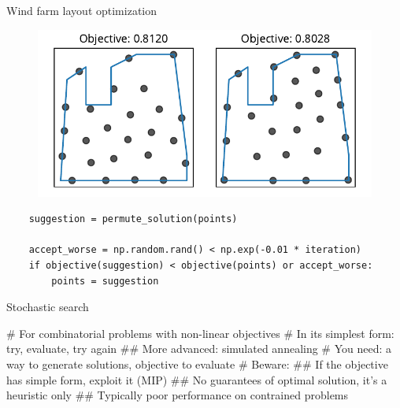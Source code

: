 \documentclass[12pt, aspectratio=149]{beamer}
\theoremstyle{plain}
\begin{document}
\begin{frame}[fragile]{Wind farm layout optimization}
\vspace*{-1em}
\begin{center}
 \begin{figure}
    	\centering
    	\includegraphics[width=0.99\linewidth]{figures/windfarm_sa}
 \end{figure}
 \end{center}
\vspace*{-2em}
\begin{center}
\begin{verbatim}
    suggestion = permute_solution(points)

    accept_worse = np.random.rand() < np.exp(-0.01 * iteration)
    if objective(suggestion) < objective(points) or accept_worse:
        points = suggestion
\end{verbatim}
\end{center}
\end{frame}


\begin{frame}[fragile]{Stochastic search}
	\begin{easylist}[itemize]
		# For combinatorial problems with non-linear objectives
		# In its simplest form: try, evaluate, try again
		## More advanced: simulated annealing
		# You need: a way to generate solutions, objective to evaluate
		# Beware:
		## If the objective has simple form, exploit it (MIP)
		## No guarantees of optimal solution, it's a heuristic only
		## Typically poor performance on contrained problems
	\end{easylist}
\end{frame}




\end{document}
